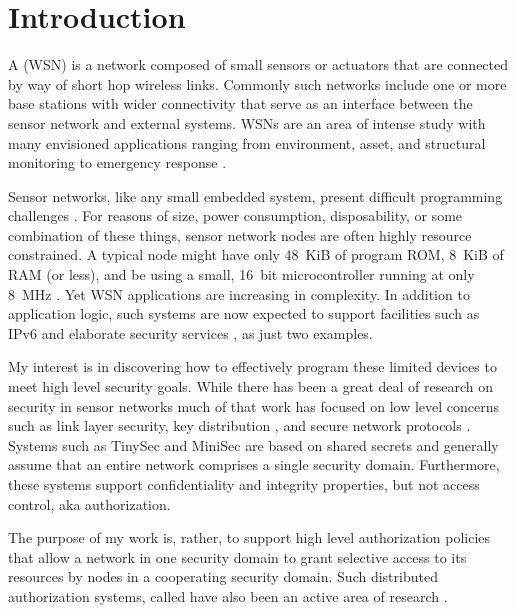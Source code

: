 \chapter{Introduction}
\label{chapter-introduction}

A  (WSN) is a network composed of small sensors or actuators
that are connected by way of short hop wireless links. Commonly such networks include one or
more base stations with wider connectivity that serve as an interface between the sensor network
and external systems. WSNs are an area of intense study with many envisioned applications
ranging from environment, asset, and structural monitoring to emergency response
\cite{Culler:2004:GEI:1018015.1018072,1038146}.

Sensor networks, like any small embedded system, present difficult programming challenges
\cite{Mottola:2011:PWS:1922649.1922656}. For reasons of size, power consumption, disposability,
or some combination of these things, sensor network nodes are often highly resource constrained.
A typical node might have only 48~KiB of program ROM, 8~KiB of RAM (or less), and be using a
small, 16~bit microcontroller running at only 8~MHz \cite{tmotesky-datasheet}. Yet WSN
applications are increasing in complexity. In addition to application logic, such systems are
now expected to support facilities such as IPv6 \cite{Hui:2008:IDL:1460412.1460415} and
elaborate security services \cite{perrig-2004}, as just two examples.

My interest is in discovering how to effectively program these limited devices to meet high
level security goals. While there has been a great deal of research on security in sensor
networks much of that work has focused on low level concerns such as link layer security, key
distribution \cite{camtepe-bulent-05}, and secure network protocols
\cite{1049776,fouladgar-3tls-2006}. Systems such as TinySec \cite{karlog-tinysec-2004} and
MiniSec \cite{luk-minisec-2007} are based on shared secrets and generally assume that an entire
network comprises a single security domain. Furthermore, these systems support confidentiality
and integrity properties, but not access control, aka authorization.

The purpose of my work is, rather, to support high level authorization policies that allow a
network in one security domain to grant selective access to its resources by nodes in a
cooperating security domain. Such distributed authorization systems, called  have also been an active area of research
\cite{chapin-skalka-wang-acmcs08}.

